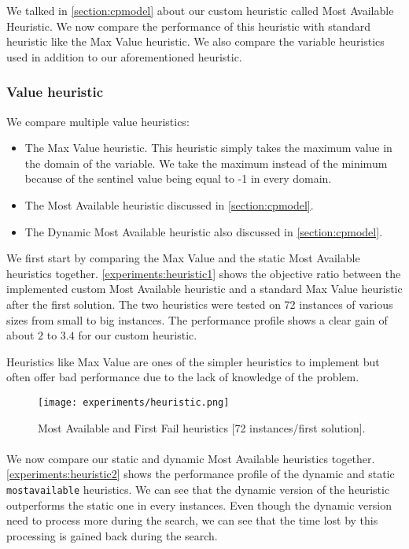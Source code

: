 \documentclass[../../thesis.tex]{subfiles}
\begin{document}
We talked in \autoref{section:cpmodel} about our custom heuristic called Most Available Heuristic.
We now compare the performance of this heuristic with standard heuristic like the Max Value heuristic.
We also compare the variable heuristics used in addition to our aforementioned heuristic.

\subsubsection{Value heuristic}

We compare multiple value heuristics:

\begin{itemize}
  \item The Max Value heuristic. This heuristic simply takes the maximum value in the domain of the variable. We 
  take the maximum instead of the minimum because of the sentinel value being equal to -1 in every domain. 
  \item The Most Available heuristic discussed in \autoref{section:cpmodel}.
  \item The Dynamic Most Available heuristic also discussed in \autoref{section:cpmodel}.
\end{itemize}

We first start by comparing the Max Value and the static Most Available heuristics together.
\autoref{experiments:heuristic1} shows the objective ratio between the implemented custom Most Available heuristic and a standard 
Max Value heuristic after the first solution.
The two heuristics were tested on 72 instances of various sizes from small to big instances.
The performance profile shows a clear gain of about $2$ to $3.4$ for our custom heuristic.

Heuristics like Max Value are ones of the simpler heuristics to implement but often offer bad performance due to 
the lack of knowledge of the problem.


\begin{figure}
  \centering
  \texttt{[image: experiments/heuristic.png]}
  \caption{Most Available and First Fail heuristics [72 instances/first solution].}
  \label{experiments:heuristic1}
\end{figure}

\paragraph{}

We now compare our static and dynamic Most Available heuristics together.
\autoref{experiments:heuristic2} shows the performance profile of the dynamic and static \texttt{mostavailable} heuristics.
We can see that the dynamic version of the heuristic outperforms the static one in every instances.
Even though the dynamic version need to process more during the search, we can see that the time lost 
by this processing is gained back during the search.
\end{document}
